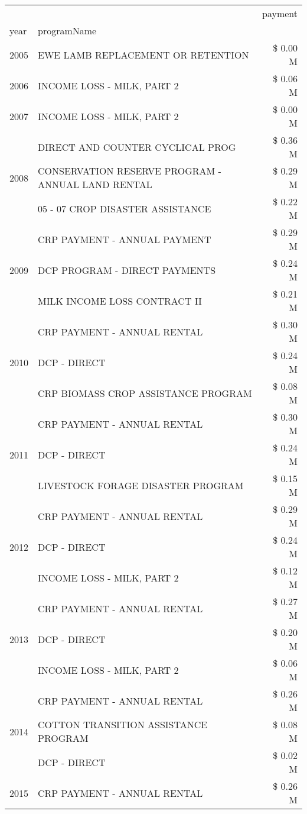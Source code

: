 \begin{tabular}{llr}
\toprule
 &  & payment \\
year & programName &  \\
\midrule
2005 & EWE LAMB REPLACEMENT OR RETENTION & \$ 0.00 M \\
\cline{1-3}
2006 & INCOME LOSS - MILK, PART 2 & \$ 0.06 M \\
\cline{1-3}
2007 & INCOME LOSS - MILK, PART 2 & \$ 0.00 M \\
\cline{1-3}
\multirow[t]{3}{*}{2008} & DIRECT AND COUNTER CYCLICAL PROG & \$ 0.36 M \\
 & CONSERVATION RESERVE PROGRAM - ANNUAL LAND RENTAL & \$ 0.29 M \\
 & 05 - 07 CROP DISASTER ASSISTANCE & \$ 0.22 M \\
\cline{1-3}
\multirow[t]{3}{*}{2009} & CRP PAYMENT - ANNUAL PAYMENT & \$ 0.29 M \\
 & DCP PROGRAM - DIRECT PAYMENTS & \$ 0.24 M \\
 & MILK INCOME LOSS CONTRACT II & \$ 0.21 M \\
\cline{1-3}
\multirow[t]{3}{*}{2010} & CRP PAYMENT - ANNUAL RENTAL & \$ 0.30 M \\
 & DCP - DIRECT & \$ 0.24 M \\
 & CRP BIOMASS CROP ASSISTANCE PROGRAM & \$ 0.08 M \\
\cline{1-3}
\multirow[t]{3}{*}{2011} & CRP PAYMENT - ANNUAL RENTAL & \$ 0.30 M \\
 & DCP - DIRECT & \$ 0.24 M \\
 & LIVESTOCK FORAGE DISASTER PROGRAM & \$ 0.15 M \\
\cline{1-3}
\multirow[t]{3}{*}{2012} & CRP PAYMENT - ANNUAL RENTAL & \$ 0.29 M \\
 & DCP - DIRECT & \$ 0.24 M \\
 & INCOME LOSS - MILK, PART 2 & \$ 0.12 M \\
\cline{1-3}
\multirow[t]{3}{*}{2013} & CRP PAYMENT - ANNUAL RENTAL & \$ 0.27 M \\
 & DCP - DIRECT & \$ 0.20 M \\
 & INCOME LOSS - MILK, PART 2 & \$ 0.06 M \\
\cline{1-3}
\multirow[t]{3}{*}{2014} & CRP PAYMENT - ANNUAL RENTAL & \$ 0.26 M \\
 & COTTON TRANSITION ASSISTANCE PROGRAM & \$ 0.08 M \\
 & DCP - DIRECT & \$ 0.02 M \\
\cline{1-3}
\multirow[t]{3}{*}{2015} & CRP PAYMENT - ANNUAL RENTAL & \$ 0.26 M \\

\end{tabular}
